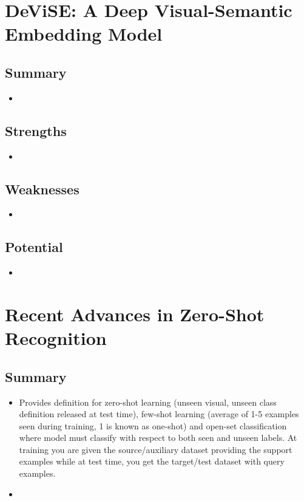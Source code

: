 \documentclass{article}
\begin{document}
\section{DeViSE: A Deep Visual-Semantic Embedding Model \cite{Frome-NIPS2013_5204}}

\subsection{Summary}
\begin{itemize}
    \item 
\end{itemize}

\subsection{Strengths}
\begin{itemize}
    \item 
\end{itemize}

\subsection{Weaknesses}
\begin{itemize}
    \item 
\end{itemize}

\subsection{Potential}
\begin{itemize}
    \item 
\end{itemize}

\section{Recent Advances in Zero-Shot Recognition \cite{DBLP:journals/corr/Fu}}

\subsection{Summary}
\begin{itemize}
  \item Provides definition for zero-shot learning (unseen visual, unseen class definition released at test time), few-shot learning (average of 1-5 examples seen during training, 1 is known as one-shot) and open-set classification where model must classify with respect to both seen and unseen labels. At training you are given the source/auxiliary dataset providing the support examples while at test time, you get the target/test dataset with query examples.
  \item 
\end{itemize}



\end{document}
